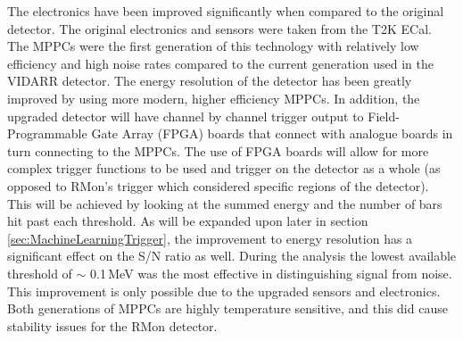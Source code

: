 The electronics have been improved significantly when compared to the original detector. The original electronics and sensors were taken from the T2K ECal. The MPPCs were the first generation of this technology with relatively low efficiency and high noise rates compared to the current generation used in the VIDARR detector. The energy resolution of the detector has been greatly improved by using more modern, higher efficiency MPPCs. In addition, the upgraded detector will have channel by channel trigger output to Field-Programmable Gate Array (FPGA) boards that connect with analogue boards in turn connecting to the MPPCs. The use of FPGA boards will allow for more complex trigger functions to be used and trigger on the detector as a whole (as opposed to RMon's trigger which considered specific regions of the detector). This will be achieved by looking at the summed energy and the number of bars hit past each threshold. As will be expanded upon later in section \ref{sec:MachineLearningTrigger}, the improvement to energy resolution has a significant effect on the S/N ratio as well. During the analysis the lowest available threshold of $\sim$ 0.1\,MeV was the most effective in distinguishing signal from noise. This improvement is only possible due to the upgraded sensors and electronics. Both generations of MPPCs are highly temperature sensitive, and this did cause stability issues for the RMon detector. %
